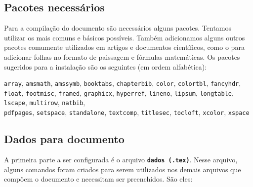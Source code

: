 \documentclass{article}
\begin{document}
\subsection{Pacotes necessários}

Para a compilação do documento são necessários alguns pacotes. Tentamos utilizar os mais comuns e básicos possíveis. Também adicionamos alguns outros pacotes comumente utilizados em artigos e documentos científicos, como o para adicionar folhas no formato de paissagem e fórmulas matemáticas. Os pacotes sugeridos para a instalação são os seguintes (em ordem alfabética):

\begin{description}
 \item \texttt{array}, \texttt{amsmath}, \texttt{amssymb}, \texttt{booktabs}, \texttt{chapterbib}, \texttt{color}, \texttt{colortbl}, \texttt{fancyhdr}, \texttt{float}, \texttt{footmisc}, \texttt{framed}, \texttt{graphicx}, \texttt{hyperref}, \texttt{lineno}, \texttt{lipsum}, \texttt{longtable}, \texttt{lscape}, \texttt{multirow}, \texttt{natbib},\\ \texttt{pdfpages}, \texttt{setspace}, \texttt{standalone}, \texttt{textcomp}, \texttt{titlesec}, \texttt{tocloft}, \texttt{xcolor}, \texttt{xspace}
\end{description}



\subsection{Dados para documento}

A primeira parte a ser configurada é o arquivo \texttt{\textbf{dados (.tex)}}. Nesse arquivo, alguns comandos foram criados para serem utilizados nos demais arquivos que compõem o documento e necessitam ser preenchidos. São eles:
\end{document}
